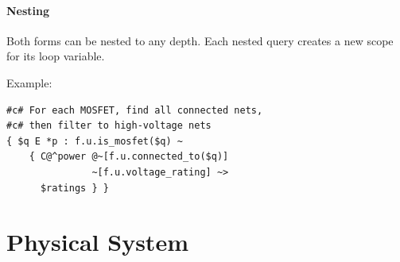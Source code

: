 \subsection{Nesting}
Both forms can be nested to any depth. Each nested query creates a new scope for its loop variable.

Example:
\begin{verbatim}
#c# For each MOSFET, find all connected nets,
#c# then filter to high-voltage nets
{ $q E *p : f.u.is_mosfet($q) ~ 
    { C@^power @~[f.u.connected_to($q)] 
               ~[f.u.voltage_rating] ~> 
      $ratings } }
\end{verbatim}\part{Physical System}
